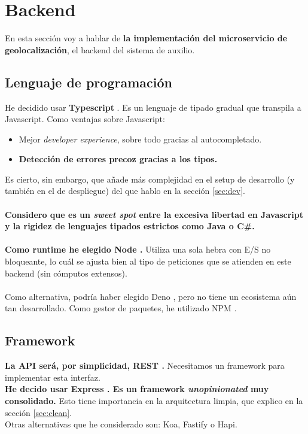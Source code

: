 \chapter{Backend}

En esta sección voy a hablar de \textbf{la implementación del microservicio de geolocalización}, el backend del sistema de auxilio.
\section{Lenguaje de programación}
He decidido usar \textbf{Typescript} \cite{typescript}. Es un lenguaje de tipado gradual que transpila a Javascript.
Como ventajas sobre Javascript:
\begin{itemize}
	\item Mejor \textit{developer experience}, sobre todo gracias al autocompletado.
	\item \textbf{Detección de errores precoz gracias a los tipos.}
\end{itemize}
Es cierto, sin embargo, que añade más complejidad en el setup de desarrollo (y también en el de despliegue) del que hablo en la sección \ref{sec:dev}. \\ \\
\textbf{Considero que es un \textit{sweet spot} entre la excesiva libertad en Javascript y la rigidez de lenguajes tipados estrictos como Java o C\#.} \\ \\

\textbf{Como runtime he elegido Node \cite{nodejs}.} Utiliza una sola hebra con E/S no bloqueante, lo cuál se ajusta bien al tipo 
de peticiones que se atienden en este backend (sin cómputos extensos).  \\ \\
Como alternativa, podría haber elegido Deno \cite{deno}, pero no tiene un ecosistema aún tan desarrollado.
Como gestor de paquetes, he utilizado NPM \cite{npm}.

\section{Framework}
\textbf{La API será, por simplicidad, REST \cite{rest}.} Necesitamos un framework para implementar esta interfaz. \\

\textbf{He decido usar Express \cite{express}. Es un framework \textit{unopinionated} muy consolidado.} Esto tiene importancia en la 
arquitectura limpia, que explico en la sección \ref{sec:clean}. \\
Otras alternativas que he considerado son: Koa, Fastify o Hapi.

